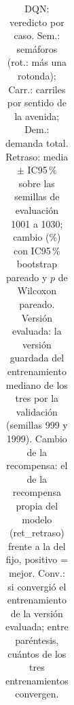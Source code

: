 \begin{table}[H]
\begin{tabular}{llcrrrrrrcl}
\bottomrule
\end{tabular}
\caption[Veredicto de DQN]{DQN: veredicto por caso. Sem.: semáforos (rot.: más una rotonda); Carr.: carriles por sentido de la avenida; Dem.: demanda total. Retraso: media $\pm$ IC95\,\% sobre las semillas de evaluación 1001 a 1030; cambio (\%) con IC95\,\% bootstrap pareado y $p$ de Wilcoxon pareado. Versión evaluada: la versión guardada del entrenamiento mediano de los tres por la validación (semillas 999 y 1999). Cambio de la recompensa: el de la recompensa propia del modelo (ret\_retraso) frente a la del fijo, positivo = mejor. Conv.: si convergió el entrenamiento de la versión evaluada; entre paréntesis, cuántos de los tres entrenamientos convergen.}
\label{tab:veredicto-dqn}
\end{table}
